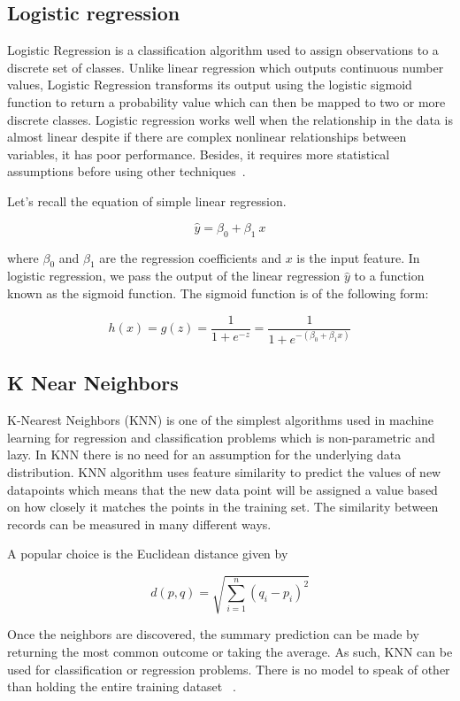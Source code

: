 \documentclass[final]{cvpr}
\begin{document}
\subsection{Logistic regression}

Logistic Regression is a classification algorithm used to assign observations to a discrete set of classes. Unlike linear
regression which outputs continuous number values, Logistic Regression transforms its output using the logistic sigmoid function to return a probability value which can then be mapped to two or more discrete classes. Logistic regression works well when the relationship in the data is almost linear
despite if there are complex nonlinear relationships between variables, it has poor performance. Besides, it requires more
statistical assumptions before using other techniques~\cite{Authors06,Authors07}.

Let’s recall the equation of simple linear regression.
 
$$\hat{y} = \beta_0 + \beta_1\ x$$

where  $\beta_0$ and $\beta_1$ are the regression coefficients and $x$ is the input feature.
In logistic regression, we pass the output of the linear regression $\hat{y}$ to a function known as the sigmoid function. The sigmoid function is of the following form:

$$h(x) = g(z) = \frac 1 {1 + e^{-z}} = \frac 1 {1 + e^{-(\beta_0 + \beta_1x)}}$$ 


\subsection{K Near Neighbors}

K-Nearest Neighbors (KNN) is one of the simplest algorithms used in machine learning for regression and classification problems which is non-parametric and lazy. In KNN
there is no need for an assumption for the underlying data distribution. KNN algorithm uses feature similarity to predict
the values of new datapoints which means that the new data point will be assigned a value based on how closely it matches the points in the training set. The similarity between records can be measured in many different ways. 

A popular choice is the Euclidean distance given by

$$d\left( p,q\right)   = \sqrt {\sum _{i=1}^{n}  \left( q_{i}-p_{i}\right)^2 }$$


Once the neighbors
are discovered, the summary prediction can be made by
returning the most common outcome or taking the average.
As such, KNN can be used for classification or regression
problems. There is no model to speak of other than holding
the entire training dataset ~\cite{Authors03}.
\end{document}
